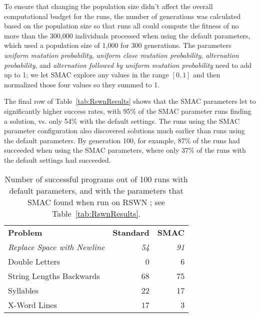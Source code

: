 To ensure that changing the population size didn't affect the overall
computational budget for the runs, the number of generations was calculated
based on the population size so that runs all could compute the fitness of no
more than the 300,000 individuals processed when using the default parameters,
which used a population size of 1,000 for 300 generations.
The parameters \textit{uniform mutation probability}, \textit{uniform close
mutation probability}, \textit{alternation probability}, and \textit{alternation followed by uniform mutation probability} need to add up
to 1; we let SMAC explore any values in the range $[0, 1]$ and then normalized
those four values so they summed to 1.


The final row of Table~\ref{tab:RswnResults} shows that the SMAC parameters
let to significantly higher success rates, with 95\% of
the SMAC parameter runs finding a solution, vs. only 54\% with the default settings.
The runs using the SMAC
parameter configuration also discovered solutions much earlier than runs using
the default parameters. By generation 100, for example, 87\% of the runs had succeeded when using the SMAC parameters, 
where only 37\% of the runs with the default settings
had succeeded.

\begin{table}[t]
	\centering
	\caption{Number of successful programs out of 100 runs with default parameters, and with the parameters that SMAC found when run on RSWN
		; see Table~\ref{tab:RswnResults}.}
	\label{table:allResults}
	\begin{tabular}{l r r}
		\textbf{Problem} & \textbf{Standard} & \textbf{SMAC} \\
		\textit{Replace Space with Newline} & \textit{54} & \textit{91} \\
		Double Letters	& 0 & 6 \\
		String Lengths Backwards & 68 & 75 \\
		Syllables & 22 & 17 \\
		X-Word Lines & 17 & 3 \\
		\bottomrule
	\end{tabular}
\end{table}


